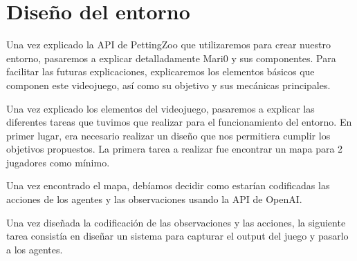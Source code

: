 \chapter{Diseño del entorno}





Una vez explicado la API de PettingZoo que utilizaremos para crear nuestro entorno, pasaremos a explicar detalladamente Mari0 y sus componentes. Para facilitar las futuras explicaciones, explicaremos los elementos básicos que componen este videojuego, así como su objetivo y sus mecánicas principales.



Una vez explicado los elementos del videojuego, pasaremos a explicar las diferentes tareas que tuvimos que realizar para el funcionamiento del entorno. En primer lugar, era necesario realizar un diseño que nos permitiera cumplir los objetivos propuestos. La primera tarea a realizar fue encontrar un mapa para 2 jugadores como mínimo.



Una vez encontrado el mapa, debíamos decidir como estarían codificadas las acciones de los agentes y las observaciones usando la API de OpenAI.





Una vez diseñada la codificación de las observaciones y las acciones, la siguiente tarea consistía en diseñar un sistema para capturar el output del juego y pasarlo a los agentes.



